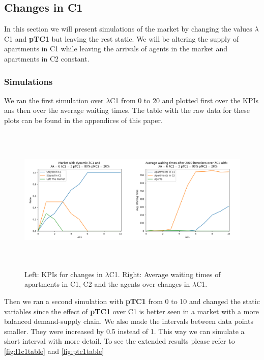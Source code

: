 \subsection{Changes in C1}

In this section we will present simulations of the market by changing the values $\lambda$C1 and \textbf{pTC1} but leaving the rest static. We will be altering the supply of apartments in C1 while leaving the arrivals of agents in the market and apartments in C2 constant.

\subsubsection{Simulations}

We ran the first simulation over $\lambda$C1 from 0 to 20 and plotted first over the KPIs ans then over the average waiting times. The table with the raw data for these plots can be found in the appendices of this paper. 

\begin{figure}
    \centering
    \includegraphics[width=1\linewidth, height = 7cm]{figures/lambdaC1inC1.png}
    \caption{Left: KPIs for changes in $\lambda$C1. Right: Average waiting times of apartments in C1, C2 and the agents over changes in $\lambda$C1.}
    \label{fig:c1lambdac1}
\end{figure}

Then we ran a second simulation with \textbf{pTC1} from 0 to 10 and changed the static variables since the effect of \textbf{pTC1} over C1 is better seen in a market with a more balanced demand-supply chain. We also made the intervals between data points smaller. They were increased by 0.5 instead of 1. This way we can simulate a short interval with more detail. To see the extended results please refer to \ref{fig:l1c1table} and \ref{fig:ptc1table}

